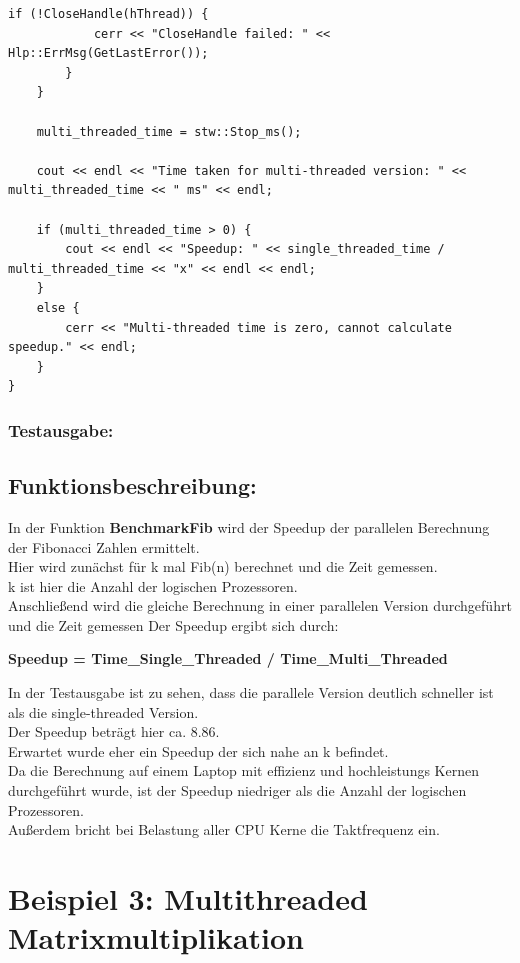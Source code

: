 \documentclass[a4paper,12pt]{article}
\begin{document}
\begin{lstlisting}[style=cppstyle]
		if (!CloseHandle(hThread)) {
			cerr << "CloseHandle failed: " << Hlp::ErrMsg(GetLastError());
		}
	}

	multi_threaded_time = stw::Stop_ms();

	cout << endl << "Time taken for multi-threaded version: " << multi_threaded_time << " ms" << endl;

	if (multi_threaded_time > 0) {
		cout << endl << "Speedup: " << single_threaded_time / multi_threaded_time << "x" << endl << endl;
	}
	else {
		cerr << "Multi-threaded time is zero, cannot calculate speedup." << endl;
	}
}
\end{lstlisting}

\subsubsection{Testausgabe:}

\subsection{Funktionsbeschreibung:}
In der Funktion \textbf{BenchmarkFib} wird der Speedup der parallelen Berechnung der Fibonacci Zahlen ermittelt.\\
Hier wird zunächst für k mal Fib(n) berechnet und die Zeit gemessen.\\
k ist hier die Anzahl der logischen Prozessoren.\\
Anschließend wird die gleiche Berechnung in einer parallelen Version durchgeführt und die Zeit gemessen
Der Speedup ergibt sich durch:\\
\begin{center}
\textbf{Speedup = Time\_Single\_Threaded / Time\_Multi\_Threaded}
\end{center}
In der Testausgabe ist zu sehen, dass die parallele Version deutlich schneller ist als die single-threaded Version.\\
Der Speedup beträgt hier ca. 8.86.\\
Erwartet wurde eher ein Speedup der sich nahe an k befindet.\\
Da die Berechnung auf einem Laptop mit effizienz und hochleistungs Kernen durchgeführt wurde, ist der Speedup niedriger als die Anzahl der logischen Prozessoren.\\
Außerdem bricht bei Belastung aller CPU Kerne die Taktfrequenz ein.\\ 
\newpage
\section{Beispiel 3: Multithreaded Matrixmultiplikation}
\end{document}
